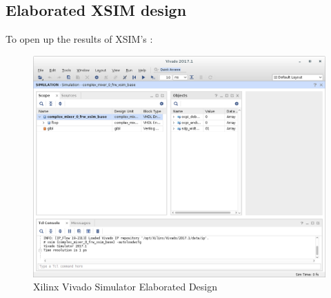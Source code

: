 \begin{flushleft}
\subsection{Elaborated XSIM design}
To open up the results of XSIM's :\newline
{}\newline
\begin{figure}[H]
	\centerline{\includegraphics[scale=0.4]{figures/xilinx_xsim_elaborated_design}}
	\caption{Xilinx Vivado Simulator Elaborated Design}
\end{figure}


\end{flushleft}
